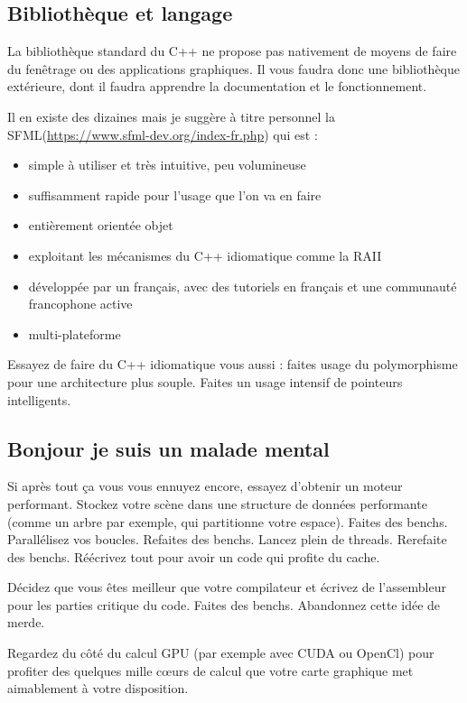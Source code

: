 \documentclass[a4paper, 11pt]{article}
\begin{document}
\subsection{Bibliothèque et langage}  
  
La bibliothèque standard du C++ ne propose pas nativement de moyens de faire du fenêtrage ou des applications graphiques. Il vous faudra donc une bibliothèque extérieure, dont il faudra apprendre la documentation et le fonctionnement.

Il en existe des dizaines mais je suggère à titre personnel la SFML(\url{https://www.sfml-dev.org/index-fr.php}) qui est :  
  
\begin{itemize}
\item simple à utiliser et très intuitive, peu volumineuse
\item suffisamment rapide pour l'usage que l'on va en faire
\item entièrement orientée objet
\item exploitant les mécanismes du C++ idiomatique comme la RAII
\item développée par un français, avec des tutoriels en français et une communauté francophone active
\item multi-plateforme
\end{itemize}

Essayez de faire du C++ idiomatique vous aussi : faites usage du polymorphisme pour une architecture plus souple. Faites un usage intensif de pointeurs intelligents. 

\subsection{Bonjour je suis un malade mental}

Si après tout ça vous vous ennuyez encore, essayez d'obtenir un moteur performant.  
  Stockez votre scène dans une structure de données performante (comme un arbre par exemple, qui partitionne votre espace).
Faites des benchs. Parallélisez vos boucles. Refaites des benchs. Lancez plein de threads. Rerefaite des benchs. Réécrivez tout pour avoir un code qui profite du cache.  
  
Décidez que vous êtes meilleur que votre compilateur et écrivez de l'assembleur pour les parties critique du code. Faites des benchs. Abandonnez cette idée de merde.  
  
Regardez du côté du calcul GPU (par exemple avec CUDA ou OpenCl) pour profiter des quelques mille cœurs de calcul que votre carte graphique met aimablement à votre disposition.     
\end{document}
